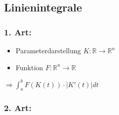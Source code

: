 \pagebreak

\subsection{Linienintegrale}
\subsubsection{1. Art:}
\begin{itemize}
	\item Parameterdarstellung $K: \mathbb{R} \rightarrow \mathbb{R}^n$
	\item Funktion $F: \mathbb{R}^n \rightarrow \mathbb{R}$
\end{itemize}
$\Rightarrow \int_a^b F(K(t)) \cdot |K'(t)| dt$

\subsubsection{2. Art:}

